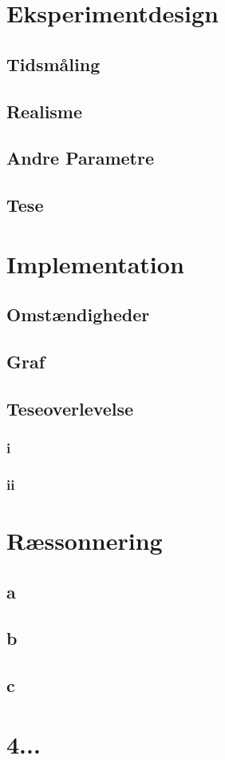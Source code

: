 \documentclass{article}
\author{Mikkel, Jannik, Rune \& Rasmus}
\date{\today}
\begin{document}
\section{Eksperimentdesign}

\subsection{Tidsmåling}

\subsection{Realisme}


\subsection{Andre Parametre}

\subsection{Tese}

\section{Implementation}

\subsection{Omstændigheder}

\subsection{Graf}

\subsection{Teseoverlevelse}

\subsubsection{i}

\subsubsection{ii}

\section{Ræssonnering}

\subsection{a}
\subsection{b}
\subsection{c}

\section{4...}
\end{document}
